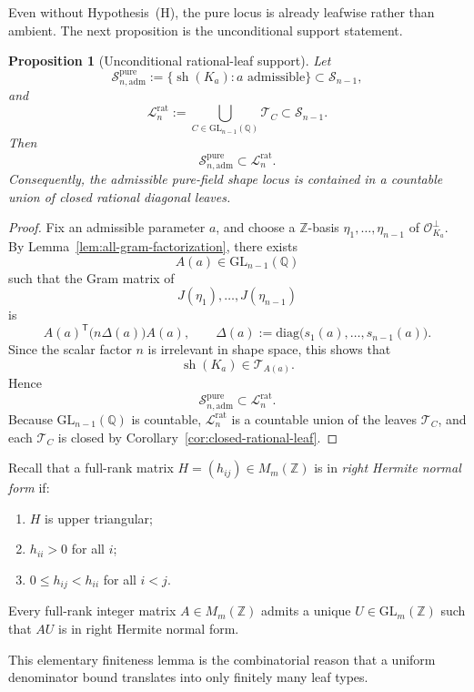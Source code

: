 \documentclass[11pt,letterpaper]{amsart}
\newcommand{\Q}{\mathbb{Q}}
\newcommand{\Z}{\mathbb{Z}}
\newcommand{\cO}{\mathcal{O}}
\newcommand{\GL}{\mathrm{GL}}
\newcommand{\diag}{\mathrm{diag}}
\theoremstyle{plain}
\newtheorem{proposition}[theorem]{Proposition}
\theoremstyle{definition}
\begin{document}
Even without Hypothesis~\textup{(H)}, the pure locus is already leafwise rather than ambient. The next proposition is the unconditional support statement.


\begin{proposition}[Unconditional rational-leaf support]
\label{prop:ambient-rational-leaf-support}
Let
\[
\mathcal S_{n,\mathrm{adm}}^{\mathrm{pure}}
:=
\{\operatorname{sh}(K_a): a\text{ admissible}\}
\subset \mathscr S_{n-1},
\]
and
\[
\mathcal L_n^{\mathrm{rat}}
:=
\bigcup_{C\in \GL_{n-1}(\Q)}\mathcal T_C
\subset \mathscr S_{n-1}.
\]
Then
\[
\mathcal S_{n,\mathrm{adm}}^{\mathrm{pure}}
\subset
\mathcal L_n^{\mathrm{rat}}.
\]
Consequently, the admissible pure-field shape locus is contained in a countable
union of closed rational diagonal leaves.
\end{proposition}

\begin{proof}
Fix an admissible parameter \(a\), and choose a \(\Z\)-basis
\(\eta_1,\dots,\eta_{n-1}\) of \(\cO_{K_a}^{\perp}\).
By Lemma~\ref{lem:all-gram-factorization}, there exists
\[
A(a)\in \GL_{n-1}(\Q)
\]
such that the Gram matrix of
\[
J(\eta_1),\dots,J(\eta_{n-1})
\]
is
\[
A(a)^{\mathsf T}\bigl(n\Delta(a)\bigr)A(a),
\qquad
\Delta(a):=\diag\bigl(s_1(a),\dots,s_{n-1}(a)\bigr).
\]
Since the scalar factor \(n\) is irrelevant in shape space, this shows that
\[
\operatorname{sh}(K_a)\in \mathcal T_{A(a)}.
\]
Hence
\[
\mathcal S_{n,\mathrm{adm}}^{\mathrm{pure}}
\subset
\mathcal L_n^{\mathrm{rat}}.
\]
Because \(\GL_{n-1}(\Q)\) is countable, \(\mathcal L_n^{\mathrm{rat}}\) is a
countable union of the leaves \(\mathcal T_C\), and each \(\mathcal T_C\) is
closed by Corollary~\ref{cor:closed-rational-leaf}.
\end{proof}

Recall that a full-rank matrix \(H=(h_{ij})\in M_m(\Z)\) is in
\emph{right Hermite normal form} if:
\begin{enumerate}[label=\textup{(\roman*)},leftmargin=2.6em]
\item \(H\) is upper triangular;
\item \(h_{ii}>0\) for all \(i\);
\item \(0\le h_{ij}<h_{ii}\) for all \(i<j\).
\end{enumerate}
Every full-rank integer matrix \(A\in M_m(\Z)\) admits a unique
\(U\in \GL_m(\Z)\) such that \(AU\) is in right Hermite normal form.

This elementary finiteness lemma is the combinatorial reason that a uniform denominator bound translates into only finitely many leaf types.
\end{document}
